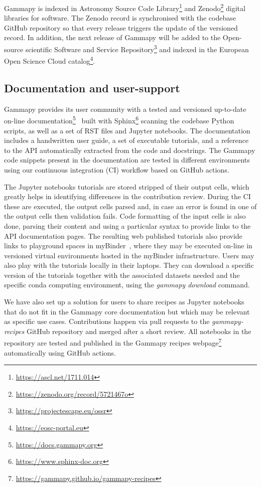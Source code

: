 Gammapy is indexed in Astronomy Source Code Library\footnote{\url{https://ascl.net/1711.014}} and Zenodo\footnote{\url{https://zenodo.org/record/5721467o}} digital libraries for software. The Zenodo record is synchronised with the codebase GitHub repository so that every release triggers the update of the versioned record. In addition, the next release of Gammapy will be added to the Open-source scientific Software and Service Repository\footnote{\url{https://projectescape.eu/ossr}} and indexed in the European Open Science Cloud catalog\footnote{\url{https://eosc-portal.eu}}.

\subsection{Documentation and user-support}
\label{ssec:documentation-and-user-support}
Gammapy provides its user community with a tested and versioned up-to-date on-line documentation\footnote{\url{https://docs.gammapy.org}}~\citep{2019ASPC..523..357B} built with Sphinx\footnote{\url{https://www.sphinx-doc.org}} scanning the codebase Python scripts, as well as a set of RST files and Jupyter notebooks. The documentation includes a handwritten user guide, a set of executable tutorials, and a reference to the API automatically extracted from the code and docstrings. The Gammapy code snippets present in the documentation are tested in different environments using our continuous integration (CI) workflow based on GitHub actions.

The Jupyter notebooks tutorials are stored stripped of their output cells, which greatly helps in identifying differences in the contribution review. During the CI these are executed, the output cells parsed and, in case an error is found in one of the output cells then validation fails. Code formatting of the input cells is also done, parsing their content and using a particular syntax to provide links to the API documentation pages. The resulting web published tutorials also provide links to playground spaces in myBinder~\citep{project_jupyter-proc-scipy-2018}, where they may be executed on-line in versioned virtual environments hosted in the myBinder infrastructure. Users may also play with the tutorials locally in their laptops. They can download a specific version of the tutorials together with the associated datasets needed and the specific conda computing environment, using the \textit{gammapy download} command.

We have also set up a solution for users to share recipes as Jupyter notebooks that do not fit in the Gammapy core documentation but which may be relevant as specific use cases. Contributions happen via pull requests to the \textit{gammapy-recipes} GitHub repository and merged after a short review. All notebooks in the repository are tested and published in the Gammapy recipes webpage\footnote{\url{https://gammapy.github.io/gammapy-recipes}} automatically using GitHub actions.

